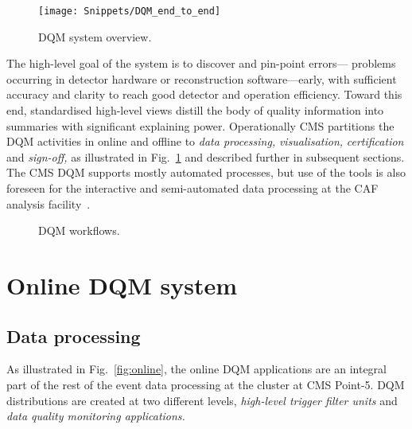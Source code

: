 \documentclass[a4paper]{jpconf}
\begin{document}
\begin{figure}[!b]
\begin{center}
\texttt{[image: Snippets/DQM\_end\_to\_end]}
\end{center}
\caption{\label{fig:overview}DQM system overview.}
\end{figure}

The high-level goal of the system is to discover and pin-point errors---%
problems occurring in detector hardware or reconstruction software---early,
with sufficient accuracy and clarity to reach good detector and operation
efficiency.  Toward this end, standardised high-level views distill the body
of quality information into summaries with significant explaining power.
Operationally CMS partitions the DQM activities in online and offline to {\em
  data processing,} {\em visualisation,} {\em certification} and {\em
  sign-off,} as illustrated in Fig.~\ref{fig:overview} and described further
in subsequent sections.  The CMS DQM supports mostly automated processes, but
use of the tools is also foreseen for the interactive and semi-automated data
processing at the CAF analysis facility~\cite{cms_caf_09}.

\begin{figure}[!b]
\begin{center}
\hspace{1in}
\caption{\label{fig:systems}DQM workflows.}
\end{center}
\end{figure}


\section{Online DQM system}
\subsection{Data processing}

As illustrated in Fig.~\ref{fig:online}, the online DQM applications
are an integral part of the rest of the event data processing at the
cluster at CMS Point-5.  DQM distributions are created at two different
levels, {\em high-level trigger filter units} and {\em data quality monitoring
  applications.}
\end{document}
